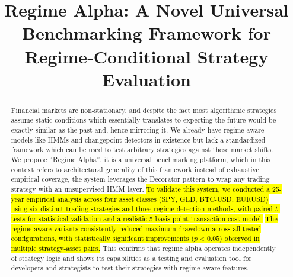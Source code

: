 \documentclass[conference]{IEEEtran}
\begin{document}
\title{Regime Alpha: A Novel Universal Benchmarking Framework for Regime-Conditional Strategy Evaluation}

\author{
\and
{}
}

\maketitle

\begin{abstract}
Financial markets are non-stationary, and despite the fact most algorithmic strategies assume static conditions which essentially translates to expecting the future would be exactly similar as the past and, hence mirroring it. We already have regime-aware models like HMMs and changepoint detectors in existence but lack a standardized framework which can be used to test arbitrary strategies against these market shifts. We propose ``Regime Alpha'', it is a universal benchmarking platform, which in this context refers to architectural generality of this framework instead of exhaustive empirical coverage, the system leverages the Decorator pattern to wrap any trading strategy with an unsupervised HMM layer. \hl{To validate this system, we conducted a 25-year empirical analysis across four asset classes (SPY, GLD, BTC-USD, EURUSD) using six distinct trading strategies and three regime detection methods, with paired $t$-tests for statistical validation and a realistic 5 basis point transaction cost model.} \hl{The regime-aware variants consistently reduced maximum drawdown across all tested configurations, with statistically significant improvements ($p < 0.05$) observed in multiple strategy-asset pairs.} This confirms that regime alpha operates independently of strategy logic and shows its capabilities as a testing and evaluation tool for developers and strategists to test their strategies with regime aware features.
\end{abstract}
\end{document}
